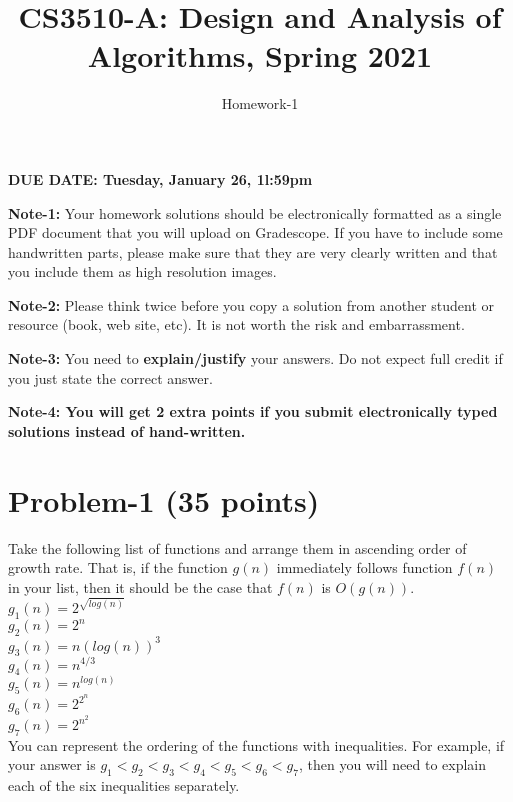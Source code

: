 \documentclass[11pt]{article}
\title{CS3510-A: Design and Analysis of Algorithms, Spring 2021}
\author{Homework-1}
\begin{document}
\maketitle
\thispagestyle{empty}
\pagestyle{empty}

\noindent
\begin{center}
{\bf DUE DATE: Tuesday, January 26, 1l:59pm}
\end{center}

\noindent
{\bf Note-1:} Your homework solutions should be electronically formatted as a single PDF document that you will upload on Gradescope. 
If you have to include some handwritten parts, please make sure that they are very clearly written and that you include them as high resolution images.

\noindent
{\bf Note-2:} Please think twice before you copy a solution from another student or resource (book, web site, etc). 
It is not worth the risk and embarrassment. 

\noindent
{\bf Note-3:} You need to {\bf explain/justify} your answers. Do not expect full credit if you just state the correct answer. 

\noindent
{\bf Note-4: You will get 2 extra points if you submit electronically typed solutions instead of hand-written.} 

\newpage
\section*{Problem-1 (35 points)}

Take the following list of functions and arrange them in ascending order of growth rate. That is, if the function $g(n)$ immediately follows function $f(n)$ in your list, then it should be the case that $f(n)$ is $O(g(n))$.\\
$g_1(n) = 2 ^ {\sqrt{log(n)}}$\\
$g_2(n) = 2 ^ n$\\
$g_3(n) = n(log(n))^3$\\
$g_4(n) = n ^ {4/3}$\\
$g_5(n) = n ^ {log(n)}$\\
$g_6(n) = 2 ^ {2 ^ n}$\\
$g_7(n) = 2 ^ {n^2}$\\

You can represent the ordering of the functions with inequalities. For example, if your answer is $g_1 < g_2 < g_3 < g_4 < g_5 < g_6 < g_7$, then you will need to explain each of the six inequalities separately. 
\end{document}
